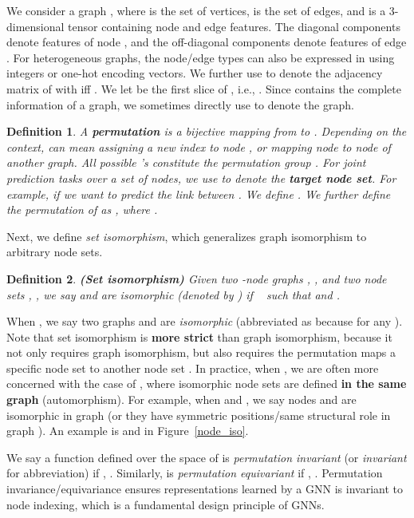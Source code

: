\documentclass{article}
\newtheorem{definition}{Definition}
\begin{document}
We consider a graph , where  is the set of  vertices,  is the set of edges, and  is a 3-dimensional tensor containing node and edge features. The diagonal components  denote features of node , and the off-diagonal components  denote features of edge . For heterogeneous graphs, the node/edge types can also be expressed in  using integers or one-hot encoding vectors. We further use  to denote the adjacency matrix of  with  iff . We let  be the first slice of , i.e., . Since  contains the complete information of a graph, we sometimes directly use  to denote the graph.

\begin{definition}\label{def:permutation} A \textbf{permutation}  is a bijective mapping from  to . Depending on the context,  can mean assigning a new index to node , or mapping node  to node  of another graph. All  possible 's constitute the permutation group . 
For joint prediction tasks over a set of nodes, we use  to denote the \textbf{target node set}. For example,  if we want to predict the link between . We define . We further define the permutation of  as , where . \end{definition}

Next, we define \textit{set isomorphism}, which generalizes graph isomorphism to arbitrary node sets.
\begin{definition}\label{set_iso}
\textbf{(Set isomorphism)} Given two -node graphs , , and two node sets , , we say  and  are isomorphic (denoted by ) if ~ such that  and . \end{definition}
When , we say two graphs  and  are \textit{isomorphic} (abbreviated as  because  for any ). Note that set isomorphism is \textbf{more strict} than graph isomorphism, because it not only requires graph isomorphism, but also requires the permutation maps a specific node set  to another node set . In practice, when , we are often more concerned with the case of , where isomorphic node sets are defined \textbf{in the same graph} (automorphism). For example, when  and , we say nodes  and  are isomorphic in graph  (or they have symmetric positions/same structural role in graph ). An example is  and  in Figure~\ref{node_iso}.

We say a function  defined over the space of  is \textit{permutation invariant} (or \textit{invariant} for abbreviation) if , . Similarly,  is \textit{permutation equivariant} if , . Permutation invariance/equivariance ensures representations learned by a GNN is invariant to node indexing, which is a fundamental design principle of GNNs.
\end{document}
